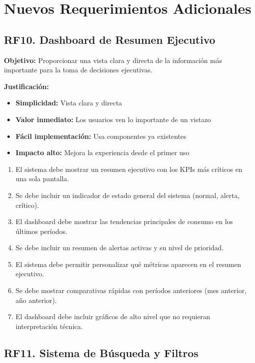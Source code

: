 \documentclass[12pt,a4paper]{article}
\begin{document}
\section{Nuevos Requerimientos Adicionales}

\subsection{RF10. Dashboard de Resumen Ejecutivo}

\textbf{Objetivo:} Proporcionar una vista clara y directa de la información más importante para la toma de decisiones ejecutivas.

\textbf{Justificación:} 
\begin{itemize}
    \item \textbf{Simplicidad:} Vista clara y directa
    \item \textbf{Valor inmediato:} Los usuarios ven lo importante de un vistazo
    \item \textbf{Fácil implementación:} Usa componentes ya existentes
    \item \textbf{Impacto alto:} Mejora la experiencia desde el primer uso
\end{itemize}

\begin{enumerate}[label=RF10.\arabic*]
    \item El sistema debe mostrar un resumen ejecutivo con los KPIs más críticos en una sola pantalla.
    \item Se debe incluir un indicador de estado general del sistema (normal, alerta, crítico).
    \item El dashboard debe mostrar las tendencias principales de consumo en los últimos períodos.
    \item Se debe incluir un resumen de alertas activas y su nivel de prioridad.
    \item El sistema debe permitir personalizar qué métricas aparecen en el resumen ejecutivo.
    \item Se debe mostrar comparativas rápidas con períodos anteriores (mes anterior, año anterior).
    \item El dashboard debe incluir gráficos de alto nivel que no requieran interpretación técnica.
\end{enumerate}

\subsection{RF11. Sistema de Búsqueda y Filtros}
\end{document}

